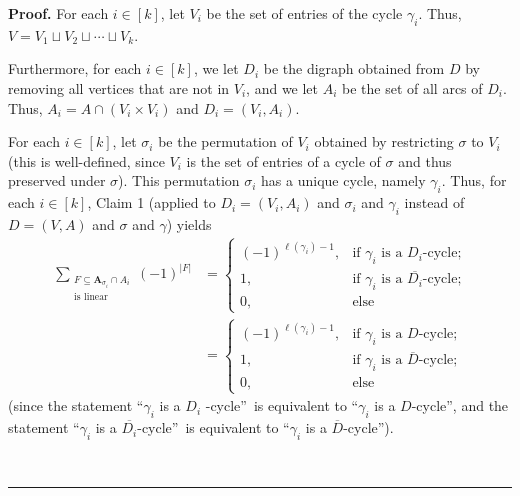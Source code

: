 \documentclass[numbers=enddot,12pt,final,onecolumn,notitlepage]{scrartcl}%
\numberwithin{exer}{section}
\theoremstyle{definition}
\newenvironment{proof}[1][Proof]{\noindent\textbf{#1.} }{\ \rule{0.5em}{0.5em}}
\let\sumnonlimits\sum
\renewcommand{\sum}{\sumnonlimits\limits}
\newenvironment{vershort}{}{}
\begin{document}
\begin{vershort}
\begin{proof}
For each $i\in\left[  k\right]  $, let $V_{i}$ be the set of entries of the
cycle $\gamma_{i}$. Thus, $V=V_{1}\sqcup V_{2}\sqcup\cdots\sqcup V_{k}$.

Furthermore, for each $i\in\left[  k\right]  $, we let $D_{i}$ be the digraph
obtained from $D$ by removing all vertices that are not in $V_{i}$, and we let
$A_{i}$ be the set of all arcs of $D_{i}$. Thus, $A_{i}=A\cap\left(
V_{i}\times V_{i}\right)  $ and $D_{i}=\left(  V_{i},A_{i}\right)  $.

For each $i\in\left[  k\right]  $, let $\sigma_{i}$ be the permutation of
$V_{i}$ obtained by restricting $\sigma$ to $V_{i}$ (this is well-defined,
since $V_{i}$ is the set of entries of a cycle of $\sigma$ and thus preserved
under $\sigma$). This permutation $\sigma_{i}$ has a unique cycle, namely
$\gamma_{i}$. Thus, for each $i\in\left[  k\right]  $, Claim 1 (applied to
$D_{i}=\left(  V_{i},A_{i}\right)  $ and $\sigma_{i}$ and $\gamma_{i}$ instead
of $D=\left(  V,A\right)  $ and $\sigma$ and $\gamma$) yields%
\begin{align}
\sum_{\substack{F\subseteq\mathbf{A}_{\sigma_{i}}\cap A_{i}\\\text{is linear}%
}}\left(  -1\right)  ^{\left\vert F\right\vert }  &  =%
\begin{cases}
\left(  -1\right)  ^{\ell\left(  \gamma_{i}\right)  -1}, & \text{if }%
\gamma_{i}\text{ is a }D_{i}\text{-cycle;}\\
1, & \text{if }\gamma_{i}\text{ is a }\overline{D_{i}}\text{-cycle;}\\
0, & \text{else}%
\end{cases}
\nonumber\\
&  =%
\begin{cases}
\left(  -1\right)  ^{\ell\left(  \gamma_{i}\right)  -1}, & \text{if }%
\gamma_{i}\text{ is a }D\text{-cycle;}\\
1, & \text{if }\gamma_{i}\text{ is a }\overline{D}\text{-cycle;}\\
0, & \text{else}%
\end{cases}
\label{pf.prop.linear-in-AsigA.7}%
\end{align}
(since the statement \textquotedblleft$\gamma_{i}$ is a $D_{i}$%
-cycle\textquotedblright\ is equivalent to \textquotedblleft$\gamma_{i}$ is a
$D$-cycle\textquotedblright, and the statement \textquotedblleft$\gamma_{i}$
is a $\overline{D_{i}}$-cycle\textquotedblright\ is equivalent to
\textquotedblleft$\gamma_{i}$ is a $\overline{D}$-cycle\textquotedblright).


\end{proof}
\end{vershort}
\end{document}
